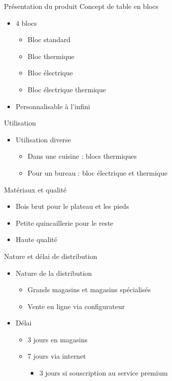 
\begin{frame}{Présentation du produit}
Concept de table en blocs
\begin{itemize}
\item 4 blocs
\begin{itemize}
\item Bloc standard
\item Bloc thermique
\item Bloc électrique
\item Bloc électrique thermique
\end{itemize}
\item Personnalisable à l'infini
\end{itemize}
\end{frame}

\begin{frame}{Utilisation}
\begin{itemize}
\item Utilisation diverse
\begin{itemize}
\item Dans une cuisine : blocs thermiques
\item Pour un bureau : bloc électrique et thermique
\end{itemize}
\end{itemize}
\end{frame}

\begin{frame}{Matériaux et qualité}
\begin{itemize}
\item Bois brut pour le plateau et les pieds
\item Petite quincaillerie pour le reste
\item Haute qualité
\end{itemize}
\end{frame}

\begin{frame}{Nature et délai de distribution}
\begin{itemize}
\item Nature de la distribution
\begin{itemize}
\item Grands magasins et magasins spécialisés
\item Vente en ligne via configurateur
\end{itemize}
\item Délai 
\begin{itemize}
\item 3 jours en magasins
\item 7 jours via internet
\begin{itemize}
\item 3 jours si souscription au service premium
\end{itemize}
\end{itemize}
\end{itemize}
\end{frame}
